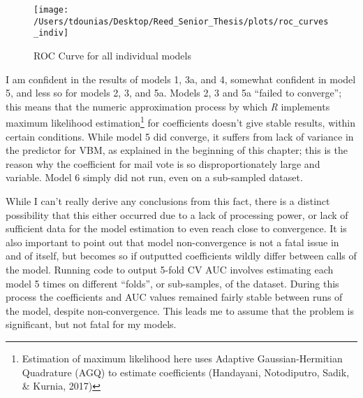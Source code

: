 \documentclass[12pt,twoside]{reedthesis}
\begin{document}
  \begin{figure}
  
  {\centering \texttt{[image: /Users/tdounias/Desktop/Reed\_Senior\_Thesis/plots/roc\_curves\_indiv]} 
  
  }
  
  \caption[ROC Curve for all individual models]{ROC Curve for all individual models}\label{fig:roc the curves}
  \end{figure}
  
  I am confident in the results of models 1, 3a, and 4, somewhat confident
  in model 5, and less so for models 2, 3, and 5a. Models 2, 3 and 5a
  ``failed to converge''; this means that the numeric approximation
  process by which \textit{R} implements maximum likelihood
  estimation\footnote{Estimation of maximum likelihood here uses Adaptive
    Gaussian-Hermitian Quadrature (AGQ) to estimate coefficients
    (Handayani, Notodiputro, Sadik, \& Kurnia, 2017)} for coefficients
  doesn't give stable results, within certain conditions. While model 5
  did converge, it suffers from lack of variance in the predictor for VBM,
  as explained in the beginning of this chapter; this is the reason why
  the coefficient for mail vote is so disproportionately large and
  variable. Model 6 simply did not run, even on a sub-sampled dataset.
  
  While I can't really derive any conclusions from this fact, there is a
  distinct possibility that this either occurred due to a lack of
  processing power, or lack of sufficient data for the model estimation to
  even reach close to convergence. It is also important to point out that
  model non-convergence is not a fatal issue in and of itself, but becomes
  so if outputted coefficients wildly differ between calls of the model.
  Running code to output 5-fold CV AUC involves estimating each model 5
  times on different ``folds'', or sub-samples, of the dataset. During
  this process the coefficients and AUC values remained fairly stable
  between runs of the model, despite non-convergence. This leads me to
  assume that the problem is significant, but not fatal for my models.
  
\end{document}
